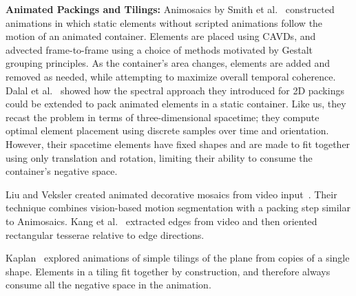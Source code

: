 \textbf{Animated Packings and Tilings:}
Animosaics by Smith et al.~\cite{Smith2005} constructed animations 
in which static elements without scripted
animations follow the motion of an animated container.  Elements are
placed using CAVDs, and advected frame-to-frame using a choice of methods
motivated by Gestalt grouping principles.
As the container's area changes, elements are added and removed as needed,
while attempting to maximize overall temporal coherence.
Dalal et al.~\cite{Dalal2006} showed how the spectral approach they
introduced for 2D packings could be extended 
to pack animated elements in a static container.  Like us, they recast
the problem in terms of three-dimensional spacetime; they compute optimal
element placement using discrete samples over time and orientation.
However, their spacetime elements have fixed
shapes and are made to fit together using only translation and rotation, 
limiting their ability to consume the container's negative space.

Liu and Veksler created animated decorative mosaics from video
input~\cite{Liu2009}.  Their technique combines vision-based
motion segmentation with a packing step similar to Animosaics.
Kang et al.~\cite{Kang2011} extracted edges from video and 
then oriented rectangular tesserae relative to edge directions.

Kaplan~\cite{Kaplan2019} explored animations of simple tilings of
the plane from copies of a single shape.  Elements in a tiling
fit together by construction, and therefore always consume all 
the negative space in the animation.


